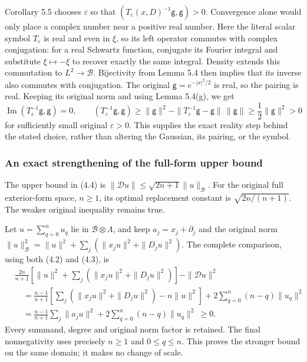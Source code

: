 \documentclass[
  11pt,
]{article}
\begin{document}
Corollary 5.5 chooses \(\varepsilon\) so that
\((T_\varepsilon(x,D)^{-1}\mathsf g,\mathsf g)>0\). Convergence alone
would only place a complex number near a positive real number. Here the
literal scalar symbol \(T_\varepsilon\) is real and even in \(\xi\), so
its left operator commutes with complex conjugation: for a real Schwartz
function, conjugate its Fourier integral and substitute
\(\xi\mapsto-\xi\) to recover exactly the same integral. Density extends
this commutation to \(L^2\to\mathcal B\). Bijectivity from Lemma 5.4
then implies that its inverse also commutes with conjugation. The
original \(\mathsf g=e^{-|x|^2/2}\) is real, so the pairing is real.
Keeping its original norm and using Lemma 5.4(g), we get \[
 \operatorname{Im}(T_\varepsilon^{-1}\mathsf g,\mathsf g)=0,\qquad
 (T_\varepsilon^{-1}\mathsf g,\mathsf g)
 \ge\|\mathsf g\|^2
       -\|T_\varepsilon^{-1}\mathsf g-\mathsf g\|\,
        \|\mathsf g\|
 \ge\frac12\|\mathsf g\|^2>0
 \tag{BS3}
\] for sufficiently small original \(\varepsilon>0\). This supplies the
exact reality step behind the stated choice, rather than altering the
Gaussian, its pairing, or the symbol.

\subsubsection{An exact strengthening of the full-form upper
bound}\label{an-exact-strengthening-of-the-full-form-upper-bound}

The upper bound in (4.4) is
\(\|\mathcal Du\|\le\sqrt{2n+1}\|u\|_{\mathcal B}\). For the original
full exterior-form space, \(n\ge1\), its optimal replacement constant is
\(\sqrt{2n/(n+1)}\). The weaker original inequality remains true.

Let \(u=\sum_{q=0}^n u_q\) lie in \(\mathcal B\otimes\Lambda\), and keep
\(a_j=x_j+\partial_j\) and the original norm
\(\|u\|_{\mathcal B}^2=\|u\|^2+\sum_j(\|x_ju\|^2+\|D_ju\|^2)\). The
complete comparison, using both (4.2) and (4.3), is \[
 \begin{aligned}
 &\frac{2n}{n+1}
    \left[\|u\|^2+\sum_j(\|x_ju\|^2+\|D_ju\|^2)\right]
       -\|\mathcal Du\|^2\\
 &\quad=\frac{n-1}{n+1}
    \left[\sum_j(\|x_ju\|^2+\|D_ju\|^2)-n\|u\|^2\right]
       +2\sum_{q=0}^n(n-q)\|u_q\|^2\\
 &\quad=\frac{n-1}{n+1}\sum_j\|a_ju\|^2
       +2\sum_{q=0}^n(n-q)\|u_q\|^2\ \ge0 .
 \end{aligned}
 \tag{BS1}
\] Every summand, degree and original norm factor is retained. The final
nonnegativity uses precisely \(n\ge1\) and \(0\le q\le n\). This proves
the stronger bound on the same domain; it makes no change of scale.
\end{document}
